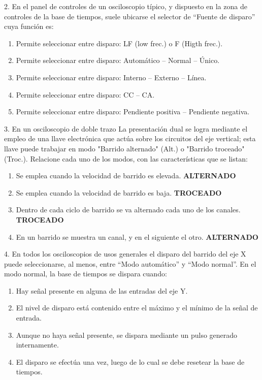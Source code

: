 \vspace{1em}

2. En el panel de controles de un osciloscopio típico, y dispuesto en la zona de controles de la base de tiempos, suele ubicarse el selector de “Fuente de disparo” cuya función es:\
\begin{enumerate}
\item[A.] Permite seleccionar entre disparo: LF (low frec.) o F (Higth frec.).
\item[B.] Permite seleccionar entre disparo: Automático -- Normal -- Único.
\item[\fbox{C}] Permite seleccionar entre disparo: Interno -- Externo -- Línea.
\item[D.] Permite seleccionar entre disparo: CC -- CA.
\item[E.] Permite seleccionar entre disparo: Pendiente positiva -- Pendiente negativa.
\end{enumerate}

\vspace{1em}

3.	En un osciloscopio de doble trazo La presentación dual se logra mediante el empleo de una llave electrónica que actúa sobre los circuitos del eje vertical; esta llave puede trabajar en modo "Barrido alternado" (Alt.) o "Barrido troceado" (Troc.). Relacione cada uno de los modos, con las características que se listan:
\begin{enumerate}
\item[A.] Se emplea cuando la velocidad de barrido es elevada. \textbf{ALTERNADO}
\item[B.] Se emplea cuando la velocidad de barrido es baja. \textbf{TROCEADO}
\item[C.] Dentro de cada ciclo de barrido se va alternado cada uno de los canales. \textbf{TROCEADO}
\item[D.] En un barrido se muestra un canal, y en el siguiente el otro. \textbf{ALTERNADO}
\end{enumerate}
\vspace{1em}
4.	En todos los osciloscopios de usos generales el disparo del barrido del eje X puede seleccionarse, al menos, entre “Modo automático” y “Modo normal”. En el modo normal, la base de tiempos se dispara cuando:
\begin{enumerate}
\item[A.] Hay señal presente en alguna de las entradas del eje Y.
\item[\fbox{B}] El nivel de disparo está contenido entre el máximo y el mínimo de la señal de entrada.
\item[C.] Aunque no haya señal presente, se dispara mediante un pulso generado internamente.
\item[D.] El disparo se efectúa una vez, luego de lo cual se debe resetear la base de tiempos.
\end{enumerate}
\vspace{1em}

